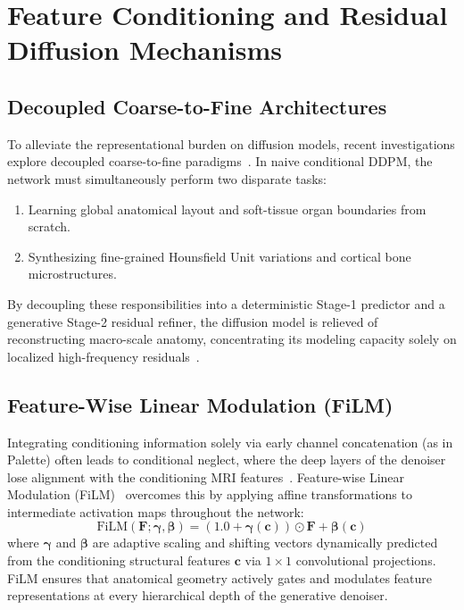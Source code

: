 \section{Feature Conditioning and Residual Diffusion Mechanisms}

\subsection{Decoupled Coarse-to-Fine Architectures}
To alleviate the representational burden on diffusion models, recent investigations explore decoupled coarse-to-fine paradigms~\cite{kazerouni2023diffusion,perez2018film,chung2023diffusion}. In naive conditional DDPM, the network must simultaneously perform two disparate tasks:
\begin{enumerate}
    \item Learning global anatomical layout and soft-tissue organ boundaries from scratch.
    \item Synthesizing fine-grained Hounsfield Unit variations and cortical bone microstructures.
\end{enumerate}
By decoupling these responsibilities into a deterministic Stage-1 predictor and a generative Stage-2 residual refiner, the diffusion model is relieved of reconstructing macro-scale anatomy, concentrating its modeling capacity solely on localized high-frequency residuals~\cite{perez2018film}.

\subsection{Feature-Wise Linear Modulation (FiLM)}
Integrating conditioning information solely via early channel concatenation (as in Palette) often leads to conditional neglect, where the deep layers of the denoiser lose alignment with the conditioning MRI features~\cite{perez2018film}. Feature-wise Linear Modulation (FiLM)~\cite{perez2018film} overcomes this by applying affine transformations to intermediate activation maps throughout the network:
\begin{equation}
\text{FiLM}(\mathbf{F}; \boldsymbol{\gamma}, \boldsymbol{\beta}) = (1.0 + \boldsymbol{\gamma}(\mathbf{c})) \odot \mathbf{F} + \boldsymbol{\beta}(\mathbf{c})
\label{eq:film_formulation}
\end{equation}
where $\boldsymbol{\gamma}$ and $\boldsymbol{\beta}$ are adaptive scaling and shifting vectors dynamically predicted from the conditioning structural features $\mathbf{c}$ via $1\times1$ convolutional projections. FiLM ensures that anatomical geometry actively gates and modulates feature representations at every hierarchical depth of the generative denoiser.

